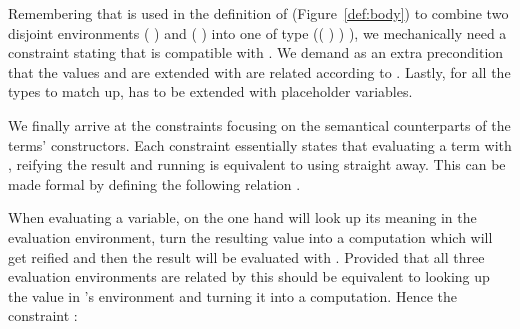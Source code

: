 
Remembering that \AF{\_>>\_} is used in the definition of  (Figure~\ref{def:body}) to
combine two disjoint environments {( )  } and
{( )  } into one of type
{(( \AF{++} ) )  )}, we mechanically need a
constraint stating that \AF{\_>>\_} is compatible with . We demand
as an extra precondition that the values  and  are extended
with are related according to . Lastly, for all the types to match up,
 has to be extended with placeholder variables.


We finally arrive at the constraints focusing on the semantical counterparts
of the terms' constructors. Each constraint essentially states that evaluating
a term with , reifying the result and running  is equivalent to
using  straight away. This can be made formal by defining the following
relation .


When evaluating a variable, on the one hand 
will look up its meaning in the evaluation environment, turn the resulting value into
a computation which will get reified and then the result will be evaluated with .
Provided that all three evaluation environments are related by  this should
be equivalent to looking up the value in 's environment and turning it into a
computation. Hence the constraint :


